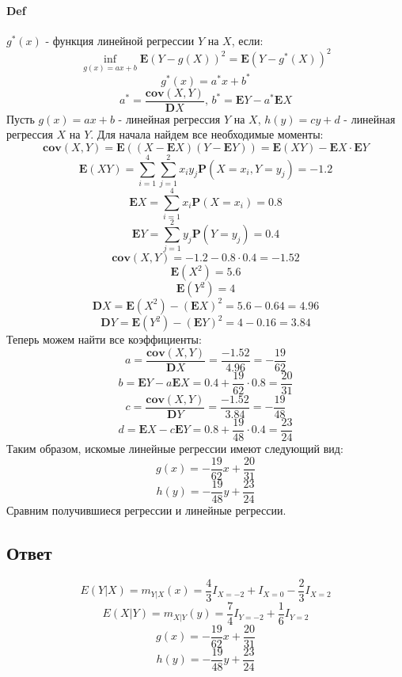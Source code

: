 \documentclass[fleqn, 10pt]{article}
\begin{document}
\paragraph{Def} \(g^{*}(x)\) - функция линейной регрессии \(Y\) на \(X\), если:
\[\inf\limits_{g(x)=ax+b}{\textbf{E}(Y-g(X))^2} = \textbf{E}(Y-g^{*}(X))^2\]
\[g^{*}(x) = a^{*}x+b^{*}\]
\[a^{*} = \frac{\textbf{cov}(X,Y)}{\textbf{D}X}\text{, } b^{*} = \textbf{E}Y - a^{*}\textbf{E}X\]
Пусть \(g(x) = ax + b\) - линейная регрессия \(Y\) на \(X\), \(h(y) = cy + d\) - линейная регрессия \(X\) на \(Y\). Для начала найдем все необходимые моменты:
\[\textbf{cov}(X,Y) = \textbf{E}((X-\textbf{E}X)(Y-\textbf{E}Y)) = \textbf{E}(XY) - \textbf{E}X\cdot\textbf{E}Y\]
\[\textbf{E}(XY) = \sum\limits_{i=1}^{4}{\sum\limits_{j=1}^{2}{x_iy_j\textbf{P}(X=x_i,Y=y_j)}} = -1.2\]
\[\textbf{E}X = \sum\limits_{i=1}^4{x_i\textbf{P}(X=x_i)} = 0.8\]
\[\textbf{E}Y = \sum\limits_{j=1}^2{y_j\textbf{P}(Y=y_j)} = 0.4\]
\[\textbf{cov}(X,Y) = -1.2 - 0.8\cdot0.4 = -1.52\]
\[\textbf{E}(X^2) = 5.6\]
\[\textbf{E}(Y^2) = 4\]
\[\textbf{D}X = \textbf{E}(X^2) - (\textbf{E}X)^2 = 5.6 - 0.64 = 4.96\]
\[\textbf{D}Y = \textbf{E}(Y^2) - (\textbf{E}Y)^2 = 4 - 0.16 = 3.84\]
Теперь можем найти все коэффициенты:
\[a = \frac{\textbf{cov}(X, Y)}{\textbf{D}X} = \frac{-1.52}{4.96} = -\frac{19}{62}\]
\[b = \textbf{E}Y - a\textbf{E}X = 0.4 + \frac{19}{62}\cdot0.8 = \frac{20}{31}\]
\[c = \frac{\textbf{cov}(X, Y)}{\textbf{D}Y} = \frac{-1.52}{3.84} = -\frac{19}{48}\]
\[d = \textbf{E}X - c\textbf{E}Y = 0.8  + \frac{19}{48}\cdot0.4 = \frac{23}{24}\]
Таким образом, искомые линейные регрессии имеют следующий вид:
\[g(x) = -\frac{19}{62}x+\frac{20}{31}\]
\[h(y) = -\frac{19}{48}y + \frac{23}{24}\]
Сравним получившиеся регрессии и линейные регрессии.

\begin{center}
\end{center}

\begin{center}
\end{center}
\subsection{Ответ}
\[E(Y|X) = m_{Y|X}(x) =  \frac{4}{3}I_{X=-2}+I_{X=0}-\frac{2}{3}I_{X=2}\]
\[E(X|Y) = m_{X|Y}(y) =  \frac{7}{4}I_{Y=-2}+\frac{1}{6}I_{Y=2}\]
\[g(x) = -\frac{19}{62}x+\frac{20}{31}\]
\[h(y) = -\frac{19}{48}y + \frac{23}{24}\]
\end{document}
